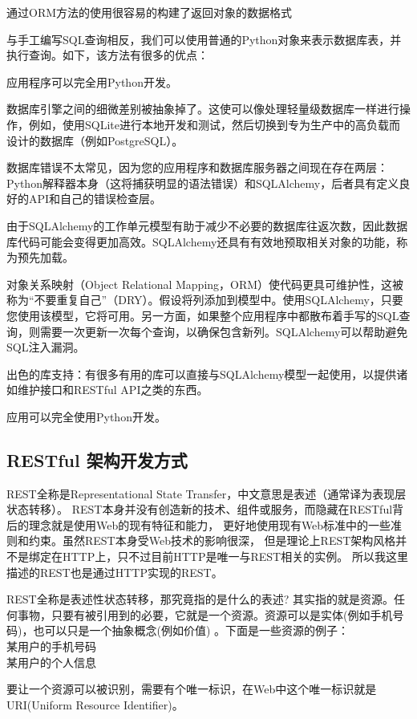 通过ORM方法的使用很容易的构建了返回对象的数据格式

与手工编写SQL查询相反，我们可以使用普通的Python对象来表示数据库表，并执行查询。如下，该方法有很多的优点：

应用程序可以完全用Python开发。

数据库引擎之间的细微差别被抽象掉了。这使可以像处理轻量级数据库一样进行操作，例如，使用SQLite进行本地开发和测试，然后切换到专为生产中的高负载而设计的数据库（例如PostgreSQL）。

数据库错误不太常见，因为您的应用程序和数据库服务器之间现在存在两层：Python解释器本身（这将捕获明显的语法错误）和SQLAlchemy，后者具有定义良好的API和自己的错误检查层。

由于SQLAlchemy的工作单元模型有助于减少不必要的数据库往返次数，因此数据库代码可能会变得更加高效。SQLAlchemy还具有有效地预取相关对象的功能，称为预先加载。

对象关系映射（Object Relational Mapping，ORM）使代码更具可维护性，这被称为“不要重复自己”（DRY）。假设将列添加到模型中。使用SQLAlchemy，只要您使用该模型，它将可用。另一方面，如果整个应用程序中都散布着手写的SQL查询，则需要一次更新一次每个查询，以确保包含新列。SQLAlchemy可以帮助避免SQL注入漏洞。

出色的库支持：有很多有用的库可以直接与SQLAlchemy模型一起使用，以提供诸如维护接口和RESTful API之类的东西。

应用可以完全使用Python开发。


\subsection{RESTful 架构开发方式}
REST全称是Representational State Transfer，中文意思是表述（通常译为表现层状态转移）。 REST本身并没有创造新的技术、组件或服务，而隐藏在RESTful背后的理念就是使用Web的现有特征和能力， 更好地使用现有Web标准中的一些准则和约束。虽然REST本身受Web技术的影响很深， 但是理论上REST架构风格并不是绑定在HTTP上，只不过目前HTTP是唯一与REST相关的实例。 所以我这里描述的REST也是通过HTTP实现的REST。

REST全称是表述性状态转移，那究竟指的是什么的表述? 其实指的就是资源。任何事物，只要有被引用到的必要，它就是一个资源。资源可以是实体(例如手机号码)，也可以只是一个抽象概念(例如价值) 。下面是一些资源的例子：
\\某用户的手机号码
\\某用户的个人信息

要让一个资源可以被识别，需要有个唯一标识，在Web中这个唯一标识就是URI(Uniform Resource Identifier)。


